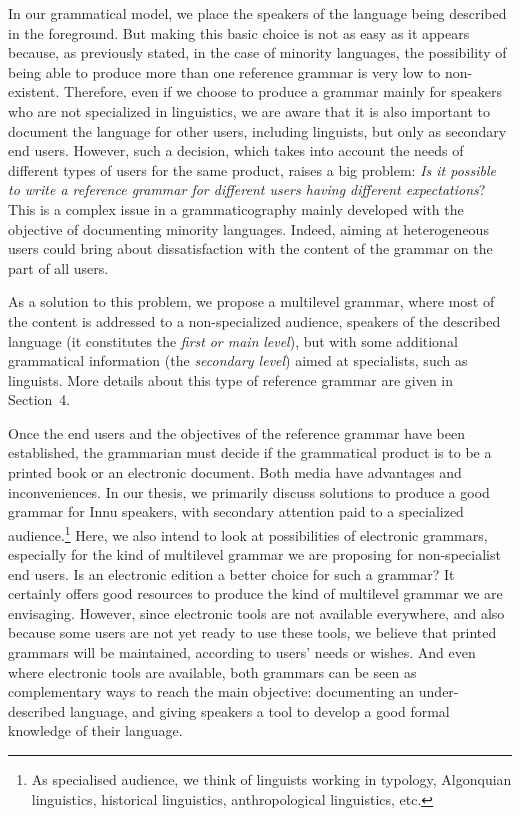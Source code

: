 \documentclass[letterpaper]{article}
\begin{document}
In our grammatical model, we place the speakers of the language being described in the foreground. But making this basic choice is not as easy as it appears because, as previously stated, in the case of minority languages, the possibility of being able to produce more than one reference grammar is very low to non-existent. Therefore, even if we choose to produce a grammar mainly for speakers who are not specialized in linguistics, we are aware that it is also important to document the language for other users, including linguists, but only as secondary end users. However, such a decision, which takes into account the needs of different types of users for the same product, raises a big problem: \textit{I}\textit{s it possible to write a reference grammar for different users having different expectations}? This is a complex issue in a grammaticography mainly developed with the objective of documenting minority languages. Indeed, aiming at heterogeneous users could bring about dissatisfaction with the content of the grammar on the part of all users.

As a solution to this problem, we propose a multilevel grammar, where most of the content is addressed to a non-specialized audience, speakers of the described language (it constitutes the \textit{first }\textit{or main }\textit{level}), but with some additional grammatical information (the \textit{secondary level}) aimed at specialists, such as linguists. More details about this type of reference grammar are given in Section~4.

Once the end users and the objectives of the reference grammar have been established, the grammarian must decide if the grammatical product is to be a printed book or an electronic document. Both media have advantages and inconveniences. In our thesis, we primarily discuss solutions to produce a good grammar for Innu speakers, with secondary attention paid to a specialized audience.\footnote{ As specialised audience, we think of linguists working in typology, Algonquian linguistics, historical linguistics, anthropological linguistics, etc. } Here, we also intend to look at possibilities of electronic grammars, especially for the kind of multilevel grammar we are proposing for non-specialist end users. Is an electronic edition a better choice for such a grammar? It certainly offers good resources to produce the kind of multilevel grammar we are envisaging. However, since electronic tools are not available everywhere, and also because some users are not yet ready to use these tools, we believe that printed grammars will be maintained, according to users{\textquoteright} needs or wishes. And even where electronic tools are available, both grammars can be seen as complementary ways to reach the main objective: documenting an under{}-described language, and giving speakers a tool to develop a good formal knowledge of their language.
\end{document}
